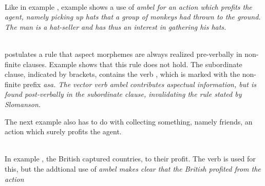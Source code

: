  \\
Like in  example ,   example   shows a use of \em ambel \em for an action which profits the agent, namely picking up hats that a group of monkeys had thrown to the ground. The man is a hat-seller and has thus an interest in gathering his hats.

\\

\citet{Slomanson2008ismil} postulates a rule that aspect morphemes are always realized pre-verbally in non-finite clauses. Example  shows that this rule does not hold. The subordinate clause, indicated by brackets, contains the verb , which is marked with the non-finite prefix \em asa\em. The vector verb \em ambel \em contributes aspectual information, but is found \em post\em-verbally in the subordinate clause, invalidating the rule stated by Slomanson.

The next example also has to do with collecting something, namely friends, an action which surely profits the agent.


 \\
In example , the British captured countries, to their profit. The verb  is used for this, but the addtional use of \em ambel \em makes clear that the British profited from the action

 \\
%

